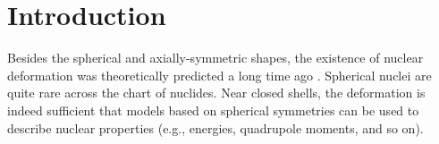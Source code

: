 \chapter{Introduction}

Besides the spherical and axially-symmetric shapes, the existence of nuclear deformation was theoretically predicted a long time ago \cite{bohr1998nuclear}. Spherical nuclei are quite rare across the chart of nuclides. Near closed shells, the deformation is indeed sufficient that models based on spherical symmetries can be used to describe nuclear properties (e.g., energies, quadrupole moments, and so on).